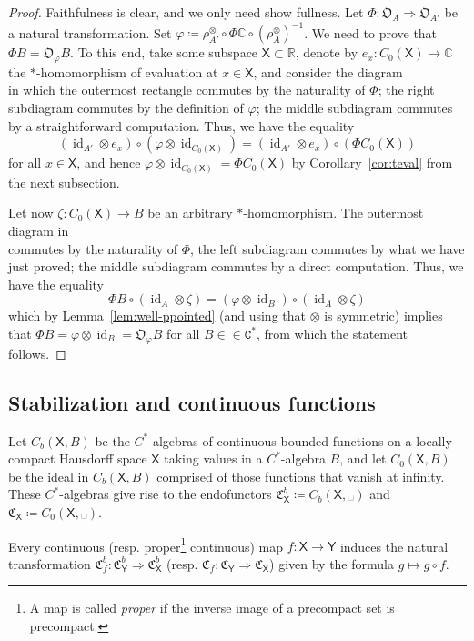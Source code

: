 \documentclass[10pt]{simplearticle}
\newcommand{\tikzinput}[1]{}
\newcommand{\id}{\operatorname{id}}
\newcommand{\Cstar}{\mathtt{C^{*}}}
\newcommand{\C}{\mathfrak{C}^{\,}}
\newcommand{\mmph}{\text{{␣}}}
\begin{document}
\begin{proof}
Faithfulness is clear, and we only need show
fullness.
Let $\Phi\colon\mathfrak{O}_{A}\Rightarrow\mathfrak{O}_{A'}$ be a
natural transformation. Set $\varphi\coloneqq\rho^{\otimes}_{A'}\circ\Phi\mathbb{C}\circ(\rho^{\otimes}_{A})^{-1}$.
We need to prove that $\Phi B=\mathfrak{O}_{\varphi}B$. To this end,
take some subspace $\mathsf{X}\subset\mathbb{R}$, denote by $e_{x}\colon C_{0}(\mathsf{X})\to\mathbb{C}$
the $*$-homomorphism of evaluation at $x\in\mathsf{X}$, and consider
the diagram
\[
\tikzinput{d275}
\]
in which the outermost rectangle commutes by the naturality of $\Phi$;
the right subdiagram commutes by the definition of $\varphi$; the
middle subdiagram commutes by a straightforward computation. Thus,
we have the equality
\[
(\id_{A'}\otimes e_{x})\circ(\varphi\otimes\id_{C_{0}(\mathsf{X})})=(\id_{A'}\otimes e_{x})\circ(\Phi C_{0}(\mathsf{X}))
\]
for all $x\in\mathsf{X}$, and hence $\varphi\otimes\id_{C_{0}(\mathsf{X})}=\Phi C_{0}(\mathsf{X})$
by Corollary~\ref{cor:teval} from the next subsection.

Let now $\zeta\colon C_{0}(\mathsf{X})\to B$ be an arbitrary $*$-homomorphism.
The outermost diagram in
\[
\tikzinput{d276}
\]
commutes by the naturality of $\Phi$, the left subdiagram commutes
by what we have just proved; the middle subdiagram commutes by a direct
computation. Thus, we have the equality
\[
\Phi B\circ(\id_{A}\otimes\zeta)=(\varphi\otimes\id_{B})\circ(\id_{A}\otimes\zeta)
\]
which by Lemma~\ref{lem:well-ppointed} (and using that $\otimes$
is symmetric) implies that $\Phi B=\varphi\otimes\id_{B}=\mathfrak{O}_{\varphi}B$
for all $B\in\in\Cstar$, from which the statement follows.
\end{proof}

\subsection{\label{subsec:stacont}Stabilization and continuous functions}

\begin{defn}\label{def:Cb}
Let $C_{b}(\mathsf{X},B)$ be the $C^{*}$-algebras
of continuous bounded functions on a locally compact Hausdorff space
$\mathsf{X}$ taking values in a $C^{*}$-algebra
$B$, and let $C_{0}(\mathsf{X},B)$ be the ideal in $C_{b}(\mathsf{X},B)$
comprised of those functions that vanish at infinity. These $C^{*}$-algebras
give rise to the endofunctors $\mathfrak{C}^{b}_{\mathsf{X}}\coloneqq C_{b}(\mathsf{X},\mmph)$
and $\C_{\mathsf{X}}\coloneqq C_{0}(\mathsf{X},\mmph)$.

Every continuous (resp. proper\footnote{A map is called \emph{proper} if the inverse image of a precompact
set is precompact.} continuous) map $f\colon\mathsf{X}\to\mathsf{Y}$ induces the natural
transformation $\mathfrak{C}^{b}_{f}\colon\mathfrak{C}^{b}_{\mathsf{Y}}\Rightarrow\mathfrak{C}^{b}_{\mathsf{X}}$
(resp. $\C_{f}\colon\C_{\mathsf{Y}}\Rightarrow\C_{\mathsf{X}}$) given
by the formula $g\mapsto g\circ f$.
\end{defn}
\end{document}
